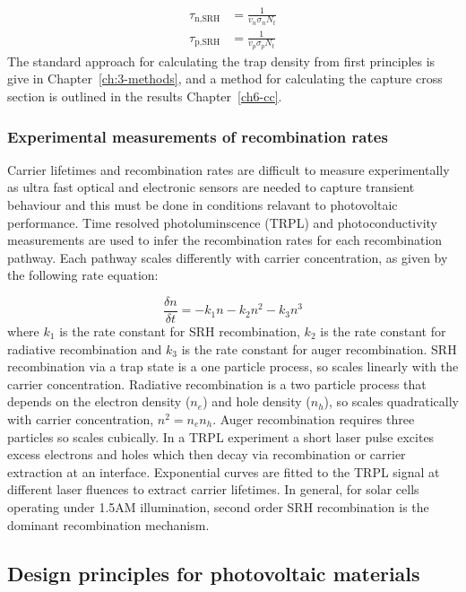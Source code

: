 \begin{align}
\tau_\textrm{n,SRH} &= \frac{1}{v_n\sigma_nN_t} \\
\tau_\textrm{p,SRH} &= \frac{1}{v_p\sigma_pN_t}  
\end{align}
The standard approach for calculating the trap density from first principles is give in Chapter\ \ref{ch:3-methods}, and a method for calculating the capture cross section is outlined in the results Chapter\ \ref{ch6-cc}.

\subsubsection{Experimental measurements of recombination rates} 

Carrier lifetimes and recombination rates are difficult to measure experimentally as ultra fast optical and electronic sensors are needed to capture transient behaviour and this must be done in conditions relavant to photovoltaic performance. Time resolved photoluminscence (TRPL) and photoconductivity measurements are used to infer the recombination rates for each recombination pathway.
Each pathway scales differently with carrier concentration, as given by the following rate equation:

$$ \frac{\delta n}{\delta t} = -k_1n -k_2n^2 -k_3n^3 $$
where $k_1$ is the rate constant for SRH recombination, $k_2$ is the rate constant for radiative recombination and $k_3$ is the rate constant for auger recombination. SRH recombination via a trap state is a one particle process, so scales linearly with the carrier concentration. Radiative recombination is a two particle process that depends on the electron density ($n_e$) and hole density ($n_h$), so scales quadratically with carrier concentration, $n^2=n_en_h$. Auger recombination requires three particles so scales cubically.
In a TRPL experiment a short laser pulse excites excess electrons and holes which then decay via recombination or carrier extraction at an interface. Exponential curves are fitted to the TRPL signal at different laser fluences to extract carrier lifetimes. In general, for solar cells operating under 1.5AM illumination, second order SRH recombination is the dominant recombination mechanism.
% 


 \subsection{Design principles for photovoltaic materials}
 
